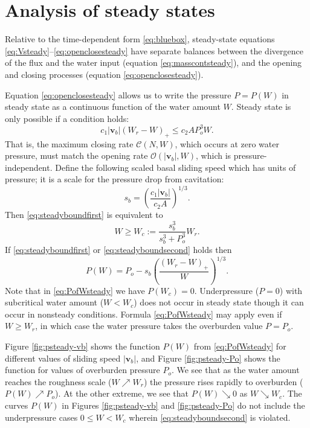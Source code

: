 \documentclass[gmd]{copernicus}   %
\newcommand\bv{\mathbf{v}}
\begin{document}
\section{Analysis of steady states}  Relative to the time-dependent form \eqref{eq:bluebox}, steady-state equations \eqref{eq:Vsteady}--\eqref{eq:openclosesteady} have separate balances between the divergence of the flux and the water input (equation \eqref{eq:masscontsteady}), and the opening and closing processes (equation \eqref{eq:openclosesteady}).

Equation \eqref{eq:openclosesteady} allows us to write the pressure $P=P(W)$ in steady state as a continuous function of the water amount $W$.  Steady state is only possible if a condition holds:
\begin{equation}
c_1 |\bv_b| (W_r - W)_+ \le c_2 A P_o^3 W. \label{eq:steadyboundfirst}
\end{equation}
That is, the maximum closing rate $\mathcal{C}(N,W)$, which occurs at zero water pressure, must match the opening rate $\mathcal{O}(|\bv_b|,W)$, which is pressure-independent.  Define the following scaled basal sliding speed which has units of pressure; it is a scale for the pressure drop from cavitation:
\begin{equation}
s_b =  \left(\frac{c_1 |\bv_b|}{c_2 A}\right)^{1/3}.  \label{eq:definesb}
\end{equation}
Then \eqref{eq:steadyboundfirst} is equivalent to
\begin{equation}
W \ge W_c := \frac{s_b^3}{s_b^3 + P_o^3} W_r. \label{eq:steadyboundsecond}
\end{equation}
If \eqref{eq:steadyboundfirst} or \eqref{eq:steadyboundsecond} holds then
\begin{equation}
P(W) = P_o - s_b \left(\frac{(W_r - W)_+}{W}\right)^{1/3}.  \label{eq:PofWsteady}
\end{equation}
Note that in \eqref{eq:PofWsteady} we have $P(W_c)=0$.  Underpressure ($P=0$) with subcritical water amount ($W<W_c$) does not occur in steady state though it can occur in nonsteady conditions.  Formula \eqref{eq:PofWsteady} may apply even if $W\ge W_r$, in which case the water pressure takes the overburden value $P = P_o$.

\newcommand{\upto}{ \!\!\nearrow\! }
\newcommand{\downto}{ \!\searrow\! }
Figure \ref{fig:psteady-vb} shows the function $P(W)$ from \eqref{eq:PofWsteady} for different values of sliding speed $|\bv_b|$, and Figure \ref{fig:psteady-Po} shows the function for values of overburden pressure $P_o$.  We see that as the water amount reaches the roughness scale ($W\upto W_r$) the pressure rises rapidly to overburden ($P(W) \upto P_o$).  At the other extreme, we see that $P(W) \downto 0$ as $W \downto W_c$.  The curves $P(W)$ in Figures \ref{fig:psteady-vb} and \ref{fig:psteady-Po} do not include the underpressure cases $0\le W < W_c$ wherein \eqref{eq:steadyboundsecond} is violated.
\end{document}
